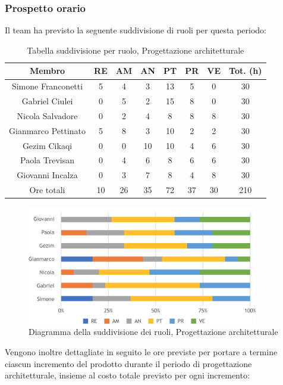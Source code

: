 \subsubsection{Prospetto orario}
Il team ha previsto la seguente suddivisione di ruoli per questa periodo:
\\
\begin{table}[h]
\caption{Tabella suddivisione per ruolo, Progettazione architetturale}
\begin{center}
\begin{tabular}{ |c|c|c|c|c|c|c|c|  }
 \hline
 Membro 		& RE 	& AM 	& AN 	& PT 	& PR 	& VE 	& Tot. (h)\\
 \hline\hline
 Simone	Franconetti		& 5 		& 4		& 3 	& 13 	& 5 		& 0 		& 30\\
 Gabriel Ciulei		& 0 		& 5 		& 2 	& 15		& 8 		& 0 		& 30\\
 Nicola	Salvadore		& 0 		& 2 		& 4 	& 8		& 8 		& 8 		& 30\\
 Gianmarco	Pettinato	& 5 		& 8 		& 3 	& 10 	& 2 		& 2 		& 30\\
 Gezim	Cikaqi		& 0 		& 0 		& 10 	& 10		& 4 		& 6	 	& 30\\
 Paola	Trevisan		& 0 		& 4 		& 6 	& 8 		& 6 		& 6 		& 30\\
 Giovanni Incalza		& 0 		& 3	 	& 7 	& 8		& 4 		& 8  	& 30\\
 \hline\hline
 Ore totali		& 10		& 26		& 35 	& 72	 	& 37 	& 30 	& 210\\
  \hline
\end{tabular}
\end{center}
\end{table}
\begin{figure}[h!]
	\includegraphics[width=0.9\textwidth]{res/img/hi336}
	\caption{Diagramma della suddivisione dei ruoli, Progettazione architetturale}
\end{figure}

\noindent Vengono inoltre dettagliate in seguito le ore previste per portare a termine ciascun incremento del prodotto durante il periodo di progettazione architetturale, insieme al costo totale previsto per ogni incremento:


